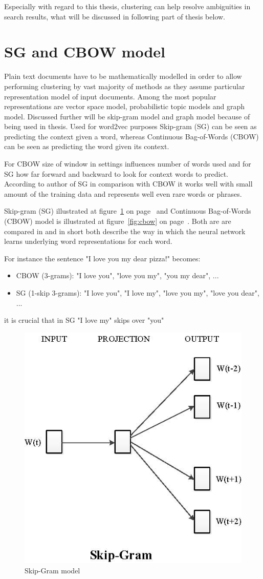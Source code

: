\documentclass[a4paper, 12pt, oneside]{Thesis} %
\begin{document}
Especially with regard to this thesis, clustering can help resolve ambiguities in search results, what will be discussed in following part of thesis below.

\section{SG and CBOW model}  Plain text documents have to be mathematically modelled in order to allow performing clustering by vast majority of methods as they assume particular representation model of input documents. Among the most popular representations are vector space model, probabilistic topic models and graph model. Discussed further will be skip-gram model and graph model because of being used in thesis. Used for word2vec purposes Skip-gram (SG) can be seen as predicting the context given a word, whereas  Continuous Bag-of-Words (CBOW) can be seen as predicting the word given its context.

For CBOW size of window in settings influences number of words used and for SG how far forward and backward to look for context words to predict. According to author of SG \cite{guthrie2006closer} in comparison with CBOW it works well with small amount of the training data and represents well even rare words or phrases. 

Skip-gram (SG) illustrated at figure~\ref{fig:skip} on page~\pageref{fig:skip} and Continuous Bag-of-Words (CBOW) model is illustrated at figure~\ref{fig:cbow} on page~\pageref{fig:cbow}. Both are are compared in \cite{guthrie2006closer} and in short both describe the way in which the neural network learns underlying word representations for each word.

For instance the sentence "I love you my dear pizza!" becomes:
\begin{itemize}
\item CBOW (3-grams): "I love you", "love you my", "you my dear", ...
\item SG (1-skip 3-grams): "I love you", "I love my", "love you my", "love you dear", ... 
\end{itemize}
it is crucial that in SG "I love my" skips over "you"

\begin{figure}[h]
  \centering
  \includegraphics[width=.5\linewidth]{Figures/skip.png}
  \caption{Skip-Gram model}
  \label{fig:skip}
\end{figure}
\end{document}
